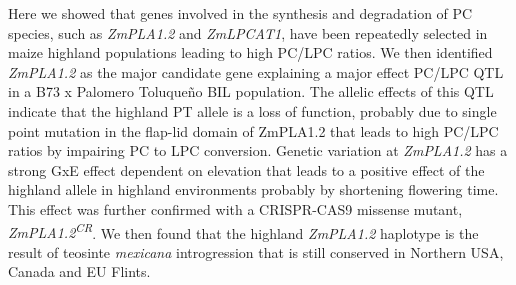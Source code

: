 \documentclass[9pt,twocolumn,twoside,lineno]{BioRxiv}
\begin{document}
Here we showed that genes involved in the synthesis and degradation of PC species, such as \textit{ZmPLA1.2} and \textit{ZmLPCAT1}, have been repeatedly selected in maize highland populations leading to high PC/LPC ratios.   
We then identified \textit{ZmPLA1.2} as the major candidate gene explaining a major effect PC/LPC QTL in a B73 x Palomero Toluqueño BIL population. 
The allelic effects of this QTL indicate that the highland PT allele is a loss of function, probably due to single point mutation in the flap-lid domain of ZmPLA1.2 that leads to high PC/LPC ratios by impairing PC to LPC conversion. 
Genetic variation at \textit{ZmPLA1.2} has a strong GxE effect dependent on elevation that leads to a positive effect of the highland allele in highland environments probably by shortening flowering time.
This effect was further confirmed with a CRISPR-CAS9 missense mutant, \textit{ZmPLA1.2\textsuperscript{CR}}.
We then found that the highland \textit{ZmPLA1.2} haplotype is the result of teosinte \textit{mexicana} introgression that is still conserved in Northern USA, Canada and EU Flints. 
\end{document}
